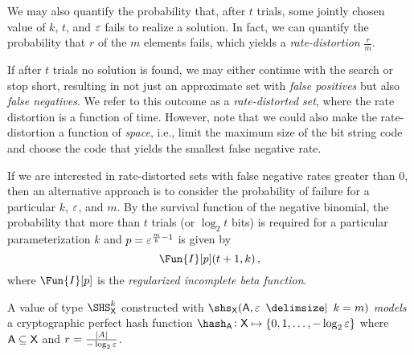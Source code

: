 \documentclass[ ../main.tex]{subfiles}
\begin{document}
We may also quantify the probability that, after $t$ trials, some jointly chosen value of $k$, $t$, and $\varepsilon$ fails to realize a solution.
In fact, we can quantify the probability that $r$ of the $m$ elements fails, which yields a \emph{rate-distortion} $\frac{r}{m}$.

If after $t$ trials no solution is found, we may either continue with the search or stop short, resulting in not just an approximate set with \emph{false positives} but also \emph{false negatives}.
We refer to this outcome as a \emph{rate-distorted set}, where the rate distortion is a function of time.
However, note that we could also make the rate-distortion a function of \emph{space}, i.e., limit the maximum size of the bit string code and choose the code that yields the smallest false negative rate.


If we are interested in rate-distorted sets with false negative rates greater than $0$, then an alternative approach is to consider the probability of failure for a particular $k$, $\varepsilon$, and $m$.
By the survival function of the negative binomial, the probability that more than $t$ trials (or $\log_2 t$ bits) is required for a particular parameterization $k$ and $p = \varepsilon^{\frac{m}{k}-1}$ is given by
\begin{equation}
	\Fun{I}[p](t+1, k)\,,
\end{equation}
where $\Fun{I}[p]$ is the \emph{regularized incomplete beta function}.





\begin{theorem}
	A value of type $\SHS_{\Set{X}}^{k}$ constructed with $\shs_{\Set{X}}(\Set{A},\fprate \; \Given \; k = m)$ \emph{models} a cryptographic perfect hash function $\hash_{\Set{A}} \colon \Set{X} \mapsto \{0,1,\ldots,-\log_2 \fprate\}$ where $\Set{A} \subseteq \Set{X}$ and $r = \frac{\lvert A\rvert}{-\log_2 \varepsilon}$.
\end{theorem}
\end{document}
